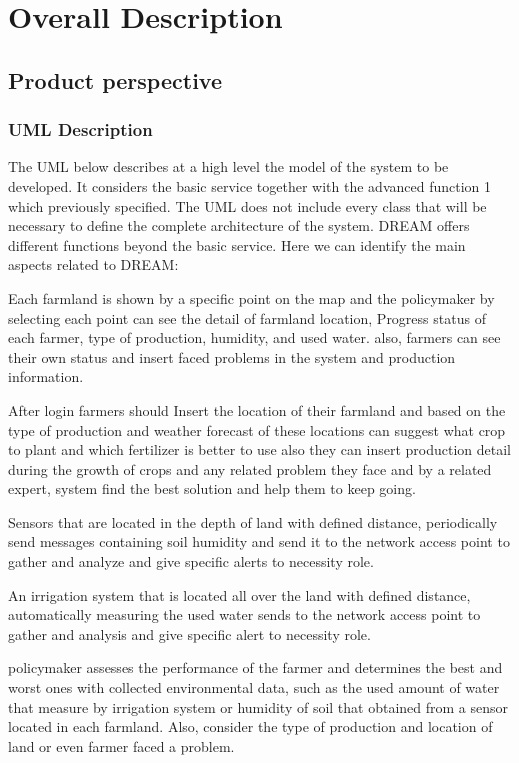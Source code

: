 \section{Overall Description}
\subsection{ Product perspective}
\subsubsection{UML Description}
The UML below describes at a high level the model of the system to be developed. It considers the basic
service together with the advanced function 1 which previously specified. The UML does not include every class that will be necessary to define the complete architecture of the system.
DREAM offers different functions beyond the basic service.
Here we can identify the main aspects related to DREAM:\newline

Each farmland is shown by a specific point on the map and the policymaker by selecting each point can see the detail of farmland location, Progress status of each farmer, type of production, humidity, and used water. also, farmers can see their own status and insert faced problems in the system and production information. \newline


After login farmers should Insert the location of  their farmland and based on the type of production and weather forecast of these locations can suggest what crop to plant and which fertilizer is better  to use also they can insert production detail during the growth of crops and any related problem they face and by a related expert, system find the best solution and help them to keep going. \newline


Sensors that are located in the depth of land with defined distance, periodically send messages containing soil humidity and send it to the network access point to gather and analyze and give specific alerts to necessity role.\newline

An irrigation system  that is located all over the land with  defined distance, automatically measuring the used water sends to the network access point to gather and analysis and give specific alert to necessity role. \newline

policymaker assesses the performance of the farmer and determines the best and worst ones with collected environmental data, such as the used amount of water that measure by irrigation system or humidity of soil that obtained from a sensor located in each farmland. Also, consider the type of production and location of land or even farmer faced a problem.\newline

